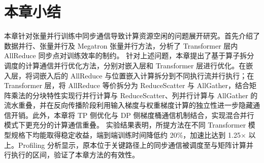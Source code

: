 \section{本章小结}

本章针对张量并行训练中同步通信导致计算资源空闲的问题展开研究。首先介绍了数据并行、张量并行及 Megatron 张量并行方法，分析了 Transformer 层内 AllReduce 同步点对训练效率的制约。
针对上述问题，本章提出了基于算子拆分调度的计算通信并行优化方法，分别对嵌入层和 Transformer 层进行优化。在嵌入层，将词嵌入后的 AllReduce 与位置嵌入计算拆分到不同执行流并行执行；在 Transformer 层，将 AllReduce 等价拆分为 ReduceScatter 与 AllGather，结合矩阵乘法的分块特性实现行并行计算与 ReduceScatter、列并行计算与 AllGather 的流水重叠，并在反向传播阶段利用输入梯度与权重梯度计算的独立性进一步隐藏通信开销。此外，本章将 TP 侧优化与 DP 侧梯度桶通信机制结合，实现混合并行模式下更充分的计算通信重叠。
实验结果表明，所提方法在不同 Transformer 模型规格下均能取得稳定收益，端到端训练时间降低约 20\%，加速比达到 1.25$\times$ 以上。Profiling 分析显示，原本位于关键路径上的同步通信被调度至与矩阵计算并行执行的区间，验证了本章方法的有效性。
